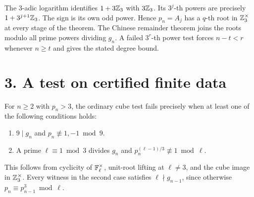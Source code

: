 \documentclass[11pt,a4paper,oneside,openany]{book}
\newcommand{\localhead}[1]{\needspace{5\baselineskip}\section*{\color{ink}#1}}
\let\sect\localhead\let\secx\localhead\let\head\localhead
\begin{document}
The $3$-adic logarithm identifies $1+3\mathbb Z_3$ with $3\mathbb Z_3$. Its $3^j$-th powers are precisely $1+3^{j+1}\mathbb Z_3$. The sign is its own odd power. Hence $p_n=A_j$ has a $q$-th root in $\mathbb Z_3^\times$ at every stage of the theorem. The Chinese remainder theorem joins the roots modulo all prime powers dividing $g_n$. A failed $3^r$-th power test forces $n-t<r$ whenever $n\ge t$ and gives the stated degree bound.



\sect{3. A test on certified finite data}
For $n\ge2$ with $p_n>3$, the ordinary cube test fails precisely when at least one of the following conditions holds:
\begin{enumerate}
\item $9\mid g_n$ and $p_n\not\equiv1,-1\bmod9$.
\item A prime $\ell\equiv1\bmod3$ divides $g_n$ and $p_n^{(\ell-1)/3}\not\equiv1\bmod\ell$.
\end{enumerate}
This follows from cyclicity of $\mathbb F_\ell^\times$, unit-root lifting at $\ell\ne3$, and the cube image in $\mathbb Z_3^\times$. Every witness in the second case satisfies $\ell\nmid g_{n-1}$, since otherwise $p_n\equiv p_{n-1}^3\bmod\ell$.
\end{document}
